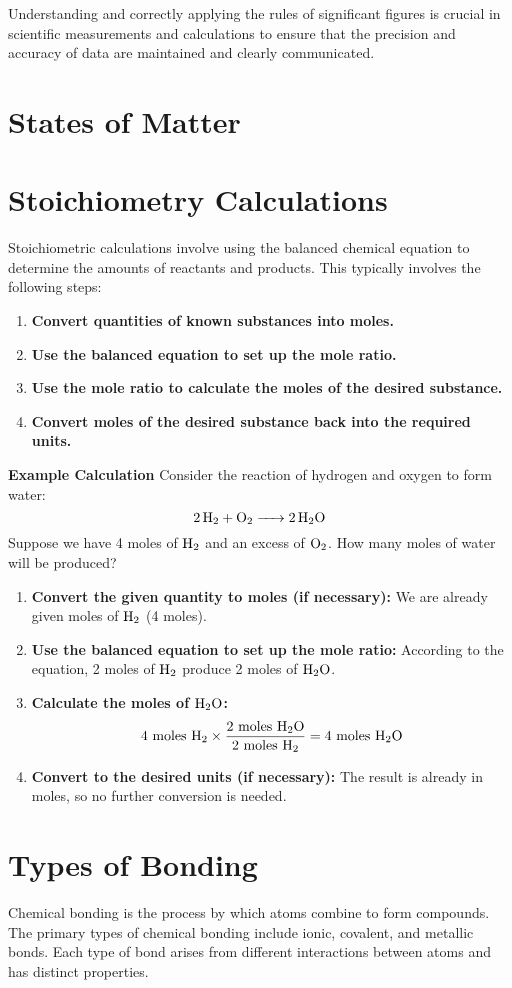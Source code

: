 \documentclass[10pt, roman]{article}
\begin{document}
Understanding and correctly applying the rules of significant figures is crucial in scientific measurements and calculations to ensure that the precision and accuracy of data are maintained and clearly communicated.

\section{States of Matter}
\section{Stoichiometry Calculations}
Stoichiometric calculations involve using the balanced chemical equation to determine the amounts of reactants and products. This typically involves the following steps:
\begin{enumerate}
    \item \textbf{Convert quantities of known substances into moles.}
    \item \textbf{Use the balanced equation to set up the mole ratio.}
    \item \textbf{Use the mole ratio to calculate the moles of the desired substance.}
    \item \textbf{Convert moles of the desired substance back into the required units.}
\end{enumerate}
\textbf{Example Calculation}
Consider the reaction of hydrogen and oxygen to form water:
\[
\ce{2H2 + O2 -> 2H2O}
\]
Suppose we have 4 moles of \(\ce{H2}\) and an excess of \(\ce{O2}\). How many moles of water will be produced?
\begin{enumerate}
    \item \textbf{Convert the given quantity to moles (if necessary):}
    We are already given moles of \(\ce{H2}\) (4 moles).
    \item \textbf{Use the balanced equation to set up the mole ratio:}
    According to the equation, 2 moles of \(\ce{H2}\) produce 2 moles of \(\ce{H2O}\).
    \item \textbf{Calculate the moles of \(\ce{H2O}\):}
    \[
    4 \text{ moles } \ce{H2} \times \frac{2 \text{ moles } \ce{H2O}}{2 \text{ moles } \ce{H2}} = 4 \text{ moles } \ce{H2O}
    \]
    \item \textbf{Convert to the desired units (if necessary):}
    The result is already in moles, so no further conversion is needed.
\end{enumerate}
\section{Types of Bonding}
Chemical bonding is the process by which atoms combine to form compounds.
The primary types of chemical bonding include ionic, covalent, and metallic bonds.
Each type of bond arises from different interactions between atoms and has distinct properties.
\end{document}
